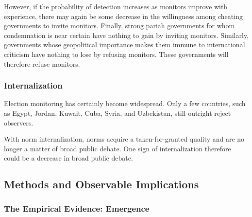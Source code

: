 However, if the probability of detection increases as monitors improve with experience, there may again be some decrease in the willingness among cheating governments to invite monitors. Finally, strong pariah governments for whom condemnation is near certain have nothing to gain by inviting monitors. Similarly, governments whose geopolitical importance makes them immune to international criticism have nothing to lose by refusing monitors. These governments will therefore refuse monitors.

\subsubsection{Internalization}
Election monitoring has certainly become widespread. Only a few countries, such as Egypt, Jordan, Kuwait, Cuba, Syria, and Uzbekistan, still outright reject observers.

With norm internalization, norms acquire a taken-for-granted quality and are no longer a matter of broad public debate. One sign of internalization therefore could be a decrease in broad public debate.

\subsection{Methods and Observable Implications}

\subsubsection{The Empirical Evidence: Emergence}
